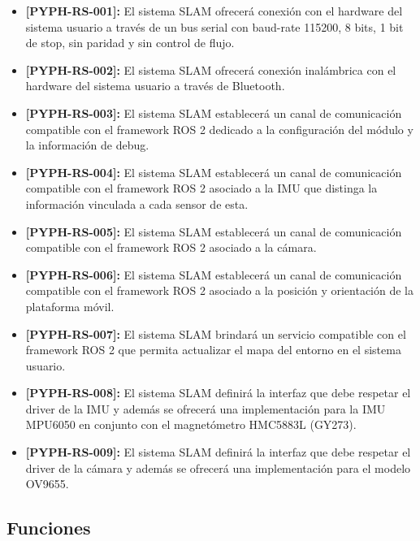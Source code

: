 \documentclass[12pt,a4paper, twosite]{article}
\begin{document}
\begin{itemize}
  \item \textbf{[PYPH-RS-001]:} El sistema SLAM ofrecerá conexión con el hardware del sistema
  usuario a través de un bus serial con baud-rate 115200, 8 bits, 1 bit de stop, sin
  paridad y sin control de flujo.
  \item \textbf{[PYPH-RS-002]:} El sistema SLAM ofrecerá conexión inalámbrica con el hardware
  del sistema usuario a través de Bluetooth.
  \item \textbf{[PYPH-RS-003]:} El sistema SLAM establecerá un canal de comunicación compatible
  con el framework ROS 2 dedicado a la configuración del módulo y la información de debug.
  \item \textbf{[PYPH-RS-004]:} El sistema SLAM establecerá un canal de comunicación compatible
  con el framework ROS 2 asociado a la IMU que distinga la información vinculada a cada sensor
  de esta.
  \item \textbf{[PYPH-RS-005]:} El sistema SLAM establecerá un canal de comunicación compatible
  con el framework ROS 2 asociado a la cámara.
  \item \textbf{[PYPH-RS-006]:} El sistema SLAM establecerá un canal de comunicación compatible
  con el framework ROS 2 asociado a la posición y orientación de la plataforma móvil.
  \item \textbf{[PYPH-RS-007]:} El sistema SLAM brindará un servicio compatible con el framework
  ROS 2 que permita actualizar el mapa del entorno en el sistema usuario.
  \item \textbf{[PYPH-RS-008]:} El sistema SLAM definirá la interfaz que debe respetar el driver
  de la IMU y además se ofrecerá una implementación para la IMU MPU6050 en conjunto con el
  magnetómetro HMC5883L (GY273).
  \item \textbf{[PYPH-RS-009]:} El sistema SLAM definirá la interfaz que debe respetar el driver
  de la cámara y además se ofrecerá una implementación para el modelo OV9655.
\end{itemize}

\subsection{Funciones}
\label{sec:org307bb59}

\end{document}
